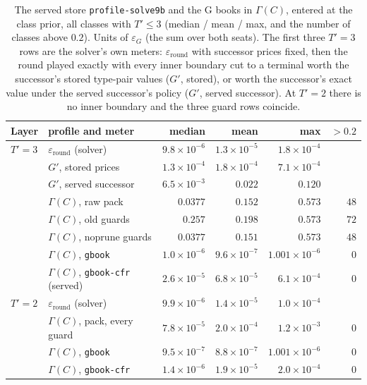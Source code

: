 \documentclass[11pt]{article}
\theoremstyle{plain}
\theoremstyle{definition}
\theoremstyle{remark}
\newcommand{\code}[1]{\texttt{\small #1}}
\newcommand{\game}{\ensuremath{G}}
\newcommand{\gp}{\ensuremath{G'}}
\newcommand{\epsG}{\ensuremath{\varepsilon_{\game}}}
\begin{document}
\begin{table}[t]
\centering
\caption{The served store \code{profile-solve9b} and the G books in
$\Gamma(C)$, entered at the class prior, all classes with $T'\le3$
(median / mean / max, and the number of classes above $0.2$). Units of
$\epsG$ (the sum over both seats). The first three $T'{=}3$ rows are the
solver's own meters: $\varepsilon_{\text{round}}$ with successor prices
fixed, then the round played exactly with every inner boundary cut to a
terminal worth the successor's stored type-pair values ($\gp$, stored),
or worth the successor's exact value under the served successor's
policy ($\gp$, served successor). At $T'{=}2$ there is no inner
boundary and the three guard rows coincide.}
\label{tab:frontier}
\small
\begin{tabular}{@{}llrrrr@{}}
\toprule
Layer & profile and meter & median & mean & max & $>0.2$\\
\midrule
$T'{=}3$ & $\varepsilon_{\text{round}}$ (solver) & $9.8\times10^{-6}$ & $1.3\times10^{-5}$ & $1.8\times10^{-4}$ & \\
 & $\gp$, stored prices & $1.3\times10^{-4}$ & $1.8\times10^{-4}$ & $7.1\times10^{-4}$ & \\
 & $\gp$, served successor & $6.5\times10^{-3}$ & $0.022$ & $0.120$ & \\
 & $\Gamma(C)$, raw pack & $0.0377$ & $0.152$ & $0.573$ & $48$\\
 & $\Gamma(C)$, old guards & $0.257$ & $0.198$ & $0.573$ & $72$\\
 & $\Gamma(C)$, noprune guards & $0.0377$ & $0.151$ & $0.573$ & $48$\\
 & $\Gamma(C)$, \code{gbook} & $1.0\times10^{-6}$ & $9.6\times10^{-7}$ & $1.001\times10^{-6}$ & $0$\\
 & $\Gamma(C)$, \code{gbook-cfr} (served) & $2.6\times10^{-5}$ & $6.8\times10^{-5}$ & $6.1\times10^{-4}$ & $0$\\
\midrule
$T'{=}2$ & $\varepsilon_{\text{round}}$ (solver) & $9.9\times10^{-6}$ & $1.4\times10^{-5}$ & $1.0\times10^{-4}$ & \\
 & $\Gamma(C)$, pack, every guard & $7.8\times10^{-5}$ & $2.0\times10^{-4}$ & $1.2\times10^{-3}$ & $0$\\
 & $\Gamma(C)$, \code{gbook} & $9.5\times10^{-7}$ & $8.8\times10^{-7}$ & $1.001\times10^{-6}$ & $0$\\
 & $\Gamma(C)$, \code{gbook-cfr} & $1.4\times10^{-6}$ & $1.9\times10^{-5}$ & $2.0\times10^{-4}$ & $0$\\
\bottomrule
\end{tabular}
\end{table}
\end{document}
